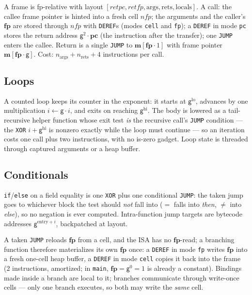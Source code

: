 \documentclass[11pt]{article}
\newcommand{\gen}{\mathsf{g}}
\newcommand{\loc}[1]{\mem[\fp\cdot #1]}
\newcommand{\pc}{\mathbf{pc}}
\newcommand{\fp}{\mathbf{fp}}
\newcommand{\mem}{\mathbf{m}}
\begin{document}
A frame is fp-relative with layout $[\mathit{retpc},\mathit{retfp},\mathrm{args},\mathrm{rets},\mathrm{locals}]$. A call: the callee frame pointer is hinted into a fresh cell $\mathit{nfp}$; the arguments and the caller's $\fp$ are stored through $\mathit{nfp}$ with \texttt{DEREF}s (modes \texttt{cell} and \texttt{fp}); a \texttt{DEREF} in mode \texttt{pc} stores the return address $\gen^{2}\cdot\pc$ (the instruction after the transfer); one \texttt{JUMP} enters the callee. Return is a single \texttt{JUMP} to $\loc{1}$ with frame pointer $\loc{\gen}$. Cost: $n_{\mathrm{args}}+n_{\mathrm{rets}}+4$ instructions per call.

\subsection{Loops}\label{sec:prog-loops}

A counted loop keeps its counter in the exponent: it starts at $\gen^{\mathrm{lo}}$, advances by one multiplication $i\gets\gen\cdot i$, and exits on reaching $\gen^{\mathrm{hi}}$. The body is lowered as a tail-recursive helper function whose exit test \emph{is} the recursive call's \texttt{JUMP} condition — the \texttt{XOR} $i+\gen^{\mathrm{hi}}$ is nonzero exactly while the loop must continue — so an iteration costs one call plus two instructions, with no is-zero gadget. Loop state is threaded through captured arguments or a heap buffer.

\subsection{Conditionals}\label{sec:prog-conditionals}

\texttt{if}/\texttt{else} on a field equality is one \texttt{XOR} plus one conditional \texttt{JUMP}: the taken jump goes to whichever block the test should \emph{not} fall into ($=$ falls into \emph{then}, $\neq$ into \emph{else}), so no negation is ever computed. Intra-function jump targets are bytecode addresses $\gen^{\mathrm{entry}+i}$, backpatched at layout.

A taken \texttt{JUMP} reloads $\fp$ from a cell, and the ISA has no $\fp$-read; a branching function therefore materializes its own $\fp$ once: a \texttt{DEREF} in mode \texttt{fp} writes $\fp$ into a fresh one-cell heap buffer, a \texttt{DEREF} in mode \texttt{cell} copies it back into the frame (2 instructions, amortized; in \texttt{main}, $\fp=\gen^{0}=1$ is already a constant). Bindings made inside a branch are local to it; branches communicate through write-once cells — only one branch executes, so both may write the \emph{same} cell.
\end{document}
